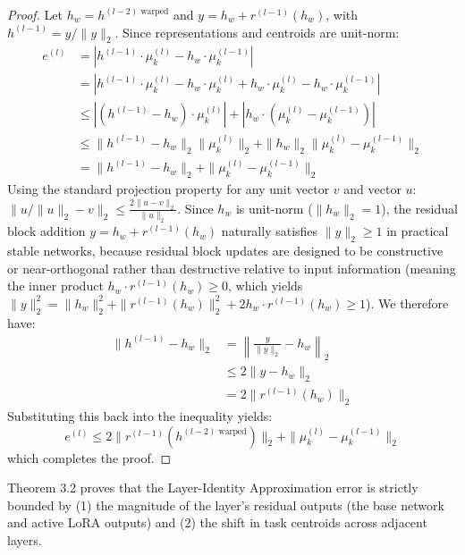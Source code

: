 \begin{proof}
Let $h_w = h^{(l-2) \text{ warped}}$ and $y = h_w + r^{(l-1)}(h_w)$, with $h^{(l-1)} = y / \|y\|_2$. Since representations and centroids are unit-norm:
\begin{align*}
e^{(l)} &= \left| h^{(l-1)} \cdot \mu_k^{(l)} - h_w \cdot \mu_k^{(l-1)} \right| \\
&= \left| h^{(l-1)} \cdot \mu_k^{(l)} - h_w \cdot \mu_k^{(l)} + h_w \cdot \mu_k^{(l)} - h_w \cdot \mu_k^{(l-1)} \right| \\
&\le \left| (h^{(l-1)} - h_w) \cdot \mu_k^{(l)} \right| + \left| h_w \cdot (\mu_k^{(l)} - \mu_k^{(l-1)}) \right| \\
&\le \| h^{(l-1)} - h_w \|_2 \|\mu_k^{(l)}\|_2 + \|h_w\|_2 \|\mu_k^{(l)} - \mu_k^{(l-1)}\|_2 \\
&= \| h^{(l-1)} - h_w \|_2 + \|\mu_k^{(l)} - \mu_k^{(l-1)}\|_2
\end{align*}
Using the standard projection property for any unit vector $v$ and vector $u$: $\| u/\|u\|_2 - v \|_2 \le \frac{2 \|u - v\|_2}{\|u\|_2}$. Since $h_w$ is unit-norm ($\|h_w\|_2 = 1$), the residual block addition $y = h_w + r^{(l-1)}(h_w)$ naturally satisfies $\|y\|_2 \ge 1$ in practical stable networks, because residual block updates are designed to be constructive or near-orthogonal rather than destructive relative to input information (meaning the inner product $h_w \cdot r^{(l-1)}(h_w) \ge 0$, which yields $\|y\|_2^2 = \|h_w\|_2^2 + \|r^{(l-1)}(h_w)\|_2^2 + 2 h_w \cdot r^{(l-1)}(h_w) \ge 1$). We therefore have:
\begin{align*}
\| h^{(l-1)} - h_w \|_2 &= \left\| \frac{y}{\|y\|_2} - h_w \right\|_2 \\
&\le 2 \| y - h_w \|_2 \\
&= 2 \| r^{(l-1)}(h_w) \|_2
\end{align*}
Substituting this back into the inequality yields:
\begin{equation*}
e^{(l)} \le 2 \| r^{(l-1)}(h^{(l-2) \text{ warped}}) \|_2 + \| \mu_k^{(l)} - \mu_k^{(l-1)} \|_2
\end{equation*}
which completes the proof.
\end{proof}

Theorem 3.2 proves that the Layer-Identity Approximation error is strictly bounded by (1) the magnitude of the layer's residual outputs (the base network and active LoRA outputs) and (2) the shift in task centroids across adjacent layers. 

